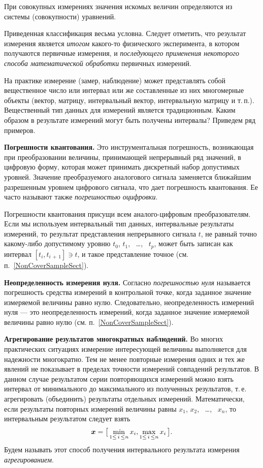 \documentclass[a5paper,openany]{book}
\newcommand{\mbf}[1]{\protect\text{\boldmath$#1$}}
\begin{document}
{{При совокупных измерениях значения искомых величин определяются из системы (совокупности)   уравнений. 


Приведенная классификация весьма условна. Следует отметить, что результат измерения является \emph{итогом} какого-то физического эксперимента, в котором получаются первичные измерения, и \emph{последующего применения некоторого способа	математической обработки} первичных измерений. 

На практике измерение (замер, наблюдение) может представлять собой вещественное число или интервал или же составленные из них многомерные объекты (вектор, матрицу, интервальный вектор, 
интервальную матрицу и т.\,п.). 
Вещественный тип данных для измерений является традиционным. 
Каким образом в результате измерений могут быть получены интервалы? Приведем ряд примеров.

{\bf Погрешности квантования.}  
Это инструментальная погрешность, возникающая при преобразовании величины, принимающей 
непрерывный ряд значений, в цифровую форму, которая может принимать дискретный набор 
допустимых уровней. Значение преобразуемого аналогового сигнала 
заменяется ближайшим разрешенным уровнем цифрового сигнала, что дает  погрешность квантования.  
Ее часто называют также \emph{погрешностью оцифровки}. 

Погрешности квантования присущи всем аналого-цифровым преобразователям. Если мы используем интервальный тип данных, интервальные результаты измерений, то результат представления непрерывного сигнала $t$, 
не равный точно какому-либо допустимому уровню $t_0$, $t_1$, \ \ldots, \ $t_p$, может быть 
записан как интервал $[t_{i}, t_{i \, + \, 1}]\ni t$,  и такое представление точное (см. п.~\ref{NonCoverSampleSect}).

{\bf Неопределенность измерения нуля.}
Согласно \cite{RMG29-2013} \emph{погрешностью нуля} называется погрешность средства 
измерений в контрольной точке, когда заданное значение измеряемой величины равно нулю. 
 Следовательно, неопределенность измерений нуля --- это 
неопределенность измерений, когда заданное значение измеряемой величины равно нулю (см. п.~\ref{NonCoverSampleSect}). 

{\bf Агрегирование результатов многократных наблюдений.} 
Во многих практических ситуациях измерение интересующей величины выполняется 
для надежности многократно. Тем не менее повторные измерения одних и тех же 
явлений не показывает  в пределах точности измерений совпадений результатов. 
В  данном случае результатом серии повторяющихся измерений можно взять интервал 
от минимального до максимального из полученных результатов, т.\,е. агрегировать 
(объединить) результаты отдельных измерений.  
Математически, если результаты повторных измерений величины равны $x_1$, $x_2$, \
\ldots, \ $x_n$, то интервальным результатом следует взять 
\begin{equation*} 
	\mbf{x} = \bigl[\,\min_{1\leq \,i \,\leq n} x_{i}, \max_{1\leq \,i \,\leq n} x_{i}\,\bigr].  
\end{equation*} 
Будем называть этот способ получения интервального результата измерения 
\emph{агрегированием}. 

}}
\end{document}
